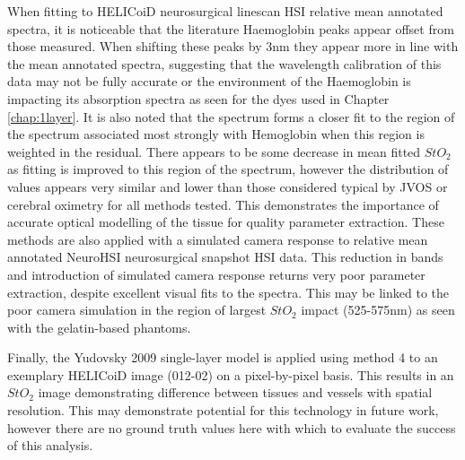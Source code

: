 When fitting to HELICoiD neurosurgical linescan HSI relative mean annotated spectra, it is noticeable that the literature Haemoglobin peaks appear offset from those measured. When shifting these peaks by 3nm they appear more in line with the mean annotated spectra, suggesting that the wavelength calibration of this data may not be fully accurate or the environment of the Haemoglobin is impacting its absorption spectra as seen for the dyes used in Chapter \ref{chap:1layer}. It is also noted that the spectrum forms a closer fit to the region of the spectrum associated most strongly with Hemoglobin when this region is weighted in the residual. There appears to be some decrease in mean fitted $StO_2$ as fitting is improved to this region of the spectrum, however the distribution of values appears very similar and lower than those considered typical by JVOS or cerebral oximetry for all methods tested. This demonstrates the importance of accurate optical modelling of the tissue for quality parameter extraction. These methods are also applied with a simulated camera response to relative mean annotated NeuroHSI neurosurgical snapshot HSI data. This reduction in bands and introduction of simulated camera response returns very poor parameter extraction, despite excellent visual fits to the spectra. This may be linked to the poor camera simulation in the region of largest $StO_2$ impact (525-575nm) as seen with the gelatin-based phantoms. 

Finally, the Yudovsky 2009 single-layer model is applied using method 4 to an exemplary HELICoiD image (012-02) on a pixel-by-pixel basis. This results in an $StO_2$ image demonstrating difference between tissues and vessels with spatial resolution. This may demonstrate potential for this technology in future work, however there are no ground truth values here with which to evaluate the success of this analysis.


